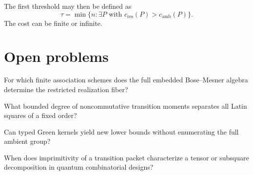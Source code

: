 The first threshold may then be defined as
\[
\tau=
\min\{n:\exists P\text{ with }c_{\mathrm{res}}(P)>c_{\mathrm{amb}}(P)\}.
\]
The cost can be finite or infinite.

\section{Open problems}
\begin{question}
For which finite association schemes does the full embedded Bose--Mesner algebra determine the restricted realization fiber?
\end{question}
\begin{question}
What bounded degree of noncommutative transition moments separates all Latin squares of a fixed order?
\end{question}
\begin{question}
Can typed Green kernels yield new lower bounds without enumerating the full ambient group?
\end{question}
\begin{question}
When does imprimitivity of a transition packet characterize a tensor or subsquare decomposition in quantum combinatorial designs?
\end{question}
